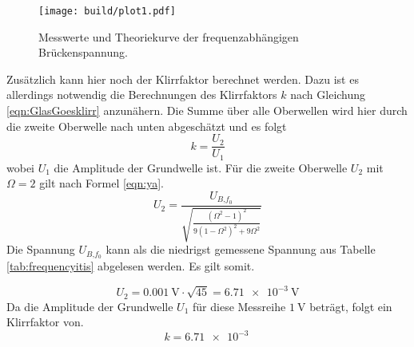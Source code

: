 \begin{figure}
    \centering
    \texttt{[image: build/plot1.pdf]}
    \caption{Messwerte und Theoriekurve der frequenzabhängigen Brückenspannung.} 
    \label{fig:plot1}
\end{figure}
Zusätzlich kann hier noch der Klirrfaktor berechnet werden. Dazu ist es allerdings notwendig die Berechnungen des Klirrfaktors $k$ nach Gleichung \eqref{eqn:GlasGoesklirr} anzunähern. 
Die Summe über alle Oberwellen wird hier durch die zweite Oberwelle nach unten abgeschätzt und es folgt
\begin{equation}
k = \frac{U_{2}}{U_{1}}
\end{equation}
wobei $U_{1}$ die Amplitude der Grundwelle ist. Für die zweite Oberwelle $U_{2}$ mit $\Omega = 2$ gilt nach Formel \eqref{eqn:ya}.
\begin{equation}
U_{2} = \frac{U_{B\text{,}{f_{0}}  }}{\sqrt{\frac{(\Omega^2 - 1)^{2}}{9(1- \Omega^2)^{2} + 9 \Omega^2}}} 
\end{equation}
Die Spannung $U_{B\text{,}{f_{0}}}$ kann als die niedrigst gemessene Spannung aus Tabelle \ref{tab:frequencyitis} abgelesen werden. Es gilt somit.

\begin{equation}
    U_{2} = \SI{0.001}{\volt} \cdot \sqrt{45} = \SI{6.71e-3}{\volt}
\end{equation}
Da die Amplitude der Grundwelle $U_{1}$ für diese Messreihe $\SI{1}{\volt}$ beträgt, folgt ein Klirrfaktor von.
\begin{equation}
k = \SI{6.71e-3}{}
\end{equation}